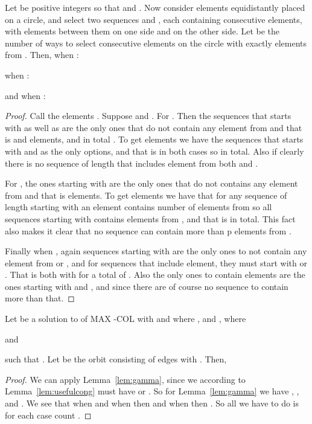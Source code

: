 \documentclass[11pt,a4paper]{article}
\begin{document}
\begin{lemma}
\label{lem:gamma}
Let  be positive integers so that  and . Now consider  elements equidistantly placed on a circle, and select two sequences  and , each containing  consecutive elements, with  elements between them on one side and  on the other side. Let  be the number of ways to select  consecutive elements on the circle with exactly  elements from . Then,
when :

when :

and when :

\end{lemma}
\begin{proof}
Call the elements . Suppose  and . 
For . Then the sequences that starts with  as well as  are the only ones that do not contain any element from  and that is  and  elements, and in total . To get  elements we have the sequences that starts with  and  as the only options, and that is  in both cases so  in total. Also if  clearly there is no sequence of length  that includes element from both  and .

For , the ones starting with  are the only ones that do not contains any element from  and that is  elements. To get  elements we have that for any sequence of length  starting with an element  contains  number of elements from  so all sequences starting with  contains  elements from , and that is  in total. This fact also makes it clear that no sequence can contain more than p elements from .

Finally when , again sequences starting with  are the only ones to not contain any element from  or , and for sequences that include  element, they must start with  or . That is both with  for a total of . Also the only ones to contain  elements are the ones starting with  and , and since  there are of course no sequence to contain more than that.
\end{proof}

 
\begin{lemma}
\label{lem:corw}
Let  be a solution to  of {\sc MAX -COL} with  and where , and , where

and 

such that 
.
Let  be the orbit consisting of edges  with . Then,

\end{lemma}
\begin{proof}
We can apply Lemma~\ref{lem:gamma}, since we according to Lemma~\ref{lem:usefulcong} must have  or . So for Lemma~\ref{lem:gamma} we have , ,  and . We see that  when  and when  then  and when  then . So all we have to do is for each case count .
\end{proof}
\end{document}
